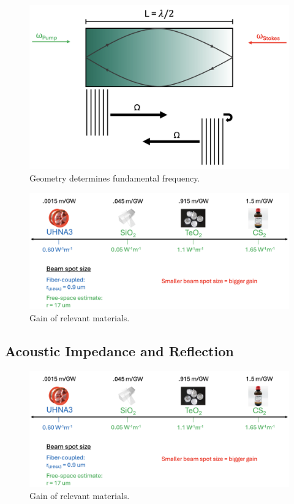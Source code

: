 \begin{figure}[t]
  \centering
  \includegraphics[width=.85\textwidth]{figs/4-Raman/GeometryDeterminesFundamentalFreq.png}
  \caption{Geometry determines fundamental frequency.}
  \label{fig:GeometryDeterminesFundamentalFreq}
\end{figure}

\begin{figure}[t]
  \centering
  \includegraphics[width=\textwidth]{figs/4-Raman/GainOfRelevantMaterials.png}
  \caption{Gain of relevant materials.}
  \label{fig:GainOfRelevantMaterials}
\end{figure}

\subsection{Acoustic Impedance and Reflection}
\label{subsec:Raman:AcousticImpedanceAndReflection}

\begin{figure}[t]
  \centering
  \includegraphics[width=\textwidth]{figs/4-Raman/GainOfRelevantMaterials.png}
  \caption{Gain of relevant materials.}
  \label{fig:GainOfRelevantMaterials}
\end{figure}

